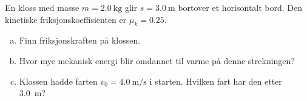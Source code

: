 %
En kloss med masse $m = \SI{2.0}{\kilo\gram}$ glir $s = \SI{3.0}{\metre}$ bortover et horisontalt bord. Den kinetiske friksjonskoeffisienten er $\mu_k = 0.25$.
\begin{enumerate}[a)]
    \item Finn friksjonskraften på klossen.
    \item Hvor mye mekanisk energi blir omdannet til varme på denne strekningen?
    \item Klossen hadde farten $v_0 = \SI{4.0}{\metre\per\second}$ i starten. Hvilken fart har den etter \SI{3.0}{\metre}?
\end{enumerate}

